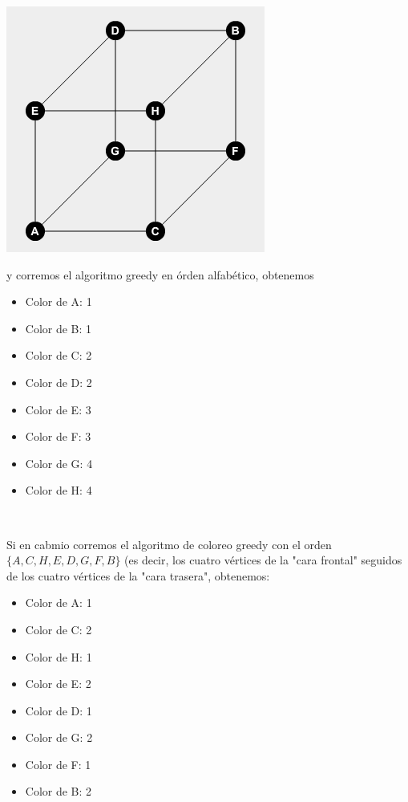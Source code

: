 \documentclass[10pt,a4paper]{article}
\begin{document}
\begin{center}

    \begin{adjustbox}{max size={\textwidth}{\textheight}}
        \includegraphics{definitions/graph_no_greedy.png}
        \end{adjustbox}
    
\end{center}

y corremos el algoritmo greedy en órden alfabético, obtenemos

\begin{itemize}

	\item Color de A: 1
	\item Color de B: 1
	\item Color de C: 2
	\item Color de D: 2
	\item Color de E: 3
	\item Color de F: 3
	\item Color de G: 4
	\item Color de H: 4
\end{itemize}

 

Si en cabmio corremos el algoritmo de coloreo greedy con el orden $\{A, C, H, E, D, G, F, B\}$ (es decir, los cuatro vértices de la "cara frontal" seguidos de los cuatro vértices de la "cara trasera", obtenemos:

\begin{itemize}

	\item Color de A: 1
	\item Color de C: 2
	\item Color de H: 1
	\item Color de E: 2
	\item Color de D: 1
	\item Color de G: 2
	\item Color de F: 1
	\item Color de B: 2
\end{itemize}
\end{document}
